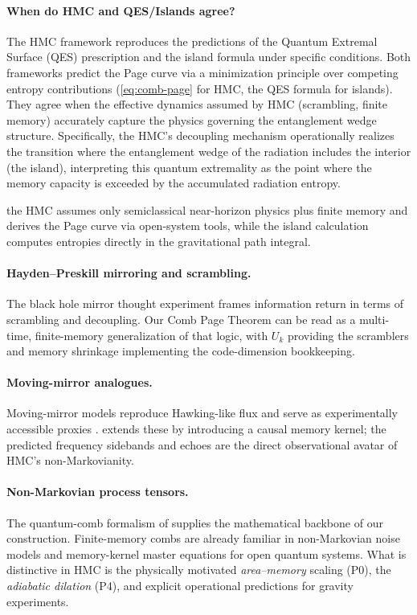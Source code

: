 \documentclass[a4paper,11pt]{article}
\newcommand{\HMC}{\textup{\textsc{HMC}}\xspace}
\theoremstyle{plain}
\theoremstyle{definition}
\theoremstyle{remark}
\begin{document}
\paragraph{When do \HMC{} and QES/Islands agree?}
The \HMC{} framework reproduces the predictions of the Quantum Extremal Surface (QES) prescription and the island formula under specific conditions. Both frameworks predict the Page curve via a minimization principle over competing entropy contributions (\eqref{eq:comb-page} for \HMC{}, the QES formula for islands). They agree when the effective dynamics assumed by \HMC{} (scrambling, finite memory) accurately capture the physics governing the entanglement wedge structure. Specifically, the \HMC{}'s decoupling mechanism operationally realizes the transition where the entanglement wedge of the radiation includes the interior (the island), interpreting this quantum extremality as the point where the memory capacity is exceeded by the accumulated radiation entropy.


the \HMC{} assumes only semiclassical near-horizon physics plus finite memory and derives the Page curve via open-system tools,
while the island calculation computes entropies directly in the gravitational path integral.

\paragraph{Hayden--Preskill mirroring and scrambling.}
The black hole mirror thought experiment \cite{Hayden:2007} frames information return in terms of scrambling and decoupling.
Our Comb Page Theorem can be read as a multi-time, finite-memory generalization of that logic, with $U_k$ providing the scramblers
and memory shrinkage implementing the code-dimension bookkeeping.

\paragraph{Moving-mirror analogues.}
Moving-mirror models reproduce Hawking-like flux and serve as experimentally accessible proxies \cite{FullingDavies:1976,GoodLinder:2017}.
 extends these by introducing a causal memory kernel; the predicted frequency sidebands and echoes
are the direct observational avatar of \HMC{}'s non-Markovianity.

\paragraph{Non-Markovian process tensors.}
The quantum-comb formalism of \cite{Chiribella:2009} supplies the mathematical backbone of our construction.
Finite-memory combs are already familiar in non-Markovian noise models and memory-kernel master equations for open quantum systems.
What is distinctive in \HMC{} is the physically motivated \emph{area--memory} scaling (P0), the \emph{adiabatic dilation} (P4), and explicit operational predictions for gravity experiments.
\end{document}
